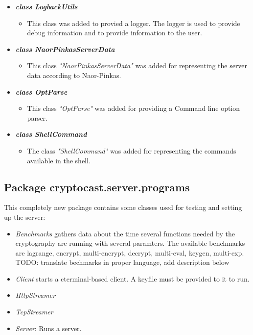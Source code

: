 \documentclass[a4paper,10pt]{scrartcl}
\begin{document}
\begin{itemize}
   \item \textbf{\textit{class LogbackUtils}}
	\begin{itemize}
	 \item This class was added to provied a logger. The logger is used to provide debug information and to provide information to the user.
	\end{itemize}
	
	 \item \textbf{\textit{class NaorPinkasServerData}}
	\begin{itemize}
	 \item This class \textit{"NaorPinkasServerData"} was added for representing the server data according to Naor-Pinkas.
	\end{itemize}
	
	 \item \textbf{\textit{class OptParse}}
	\begin{itemize}
	 \item This class \textit{"OptParse"} was added for providing a Command line option parser.
	\end{itemize}
	
   \item \textit{\textbf{class ShellCommand}}
	\begin{itemize}
	 \item The class \textit{"ShellCommand"} was added for representing the commands available in the shell.
	\end{itemize}
	
\end{itemize}


\subsection{Package cryptocast.server.programs}
This  completely new package contains some classes used for testing and setting up the server:
\begin{itemize}
	\item \textit{Benchmarks} gathers data about the time several functions needed by the cryptography are running
		with several paramters. The available benchmarks are  lagrange, encrypt, multi-encrypt, decrypt, multi-eval, keygen, multi-exp.
		TODO: translate bechmarks in proper language, add description below
	\item \textit{Client} starts a cterminal-based client. A keyfile must be provided to it to run.
	\item \textit{HttpStreamer} 
	\item \textit{TcpStreamer}
	\item \textit{Server}: Runs a server.
\end{itemize}
\end{document}
